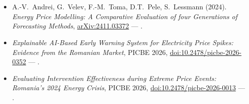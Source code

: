 \section{}
\small
\begin{itemize}
\item A.-V.~Andrei, G.~Velev, F.-M.~Toma, D.T.~Pele, S.~Lessmann (2024). \emph{Energy Price Modelling: A Comparative Evaluation of four Generations of Forecasting Methods}, \href{https://arxiv.org/abs/2411.03372}{arXiv:2411.03372} --- .
\item \emph{Explainable AI-Based Early Warning System for Electricity Price Spikes: Evidence from the Romanian Market}, PICBE 2026, \href{https://doi.org/10.2478/picbe-2026-0352}{doi:10.2478/picbe-2026-0352} --- .
\item \emph{Evaluating Intervention Effectiveness during Extreme Price Events: Romania's 2024 Energy Crisis}, PICBE 2026, \href{https://doi.org/10.2478/picbe-2026-0013}{doi:10.2478/picbe-2026-0013} --- .
\end{itemize}
\normalsize
